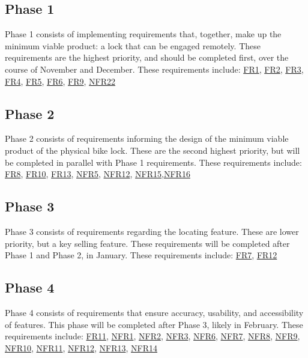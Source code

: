 \documentclass[12pt]{article}
\begin{document}

\subsection{Phase 1}
Phase 1 consists of implementing requirements that, together, make up the minimum viable product: a lock that can be engaged remotely. These requirements are the highest priority, and should be completed first, over the course of November and December. These requirements include:
\hyperref[FR1]{FR1}, \hyperref[FR2]{FR2}, \hyperref[FR3]{FR3}, \hyperref[FR4]{FR4}, \hyperref[FR5]{FR5}, \hyperref[FR6]{FR6}, \hyperref[FR9]{FR9}, \hyperref[NFR22]{NFR22}

\subsection{Phase 2}
Phase 2 consists of requirements informing the design of the minimum viable product of the physical bike lock. These are the second highest priority, but will be completed in parallel with Phase 1 requirements. These requirements include:
\hyperref[FR8]{FR8}, \hyperref[FR10]{FR10}, \hyperref[FR13]{FR13}, \hyperref[NFR5]{NFR5}, \hyperref[NFR12]{NFR12}, \hyperref[NFR15]{NFR15},\hyperref[NFR16]{NFR16}

\subsection{Phase 3}
Phase 3 consists of requirements regarding the locating feature. These are lower priority, but a key selling feature. These requirements will be completed after Phase 1 and Phase 2, in January. These requirements include:
\hyperref[FR7]{FR7}, \hyperref[FR12]{FR12}

\subsection{Phase 4}
Phase 4 consists of requirements that ensure accuracy, usability, and accessibility of features. This phase will be completed after Phase 3, likely in February. These requirements include:
\hyperref[FR11]{FR11}, \hyperref[NFR1]{NFR1}, \hyperref[NFR2]{NFR2}, \hyperref[NFR3]{NFR3}, \hyperref[NFR6]{NFR6}, \hyperref[NFR7]{NFR7}, \hyperref[NFR8]{NFR8}, \hyperref[NFR9]{NFR9}, \hyperref[NFR10]{NFR10}, \hyperref[NFR11]{NFR11}, \hyperref[NFR12]{NFR12}, \hyperref[NFR13]{NFR13}, \hyperref[NFR14]{NFR14}
\end{document}
